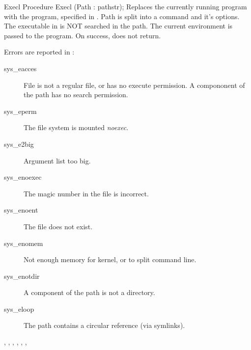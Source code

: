 \begin{procedure}{Execl}
\Declaration
Procedure Execl (Path : pathstr);
\Description
Replaces the currently running program with the program, specified in
. Path is split into a command and it's options.
The executable in  is NOT searched in the path.
The current environment is passed to the program.
On success,  does not return.

\Errors
Errors are reported in :
\begin{description}
\item[sys\_eacces] File is not a regular file, or has no execute permission.
A compononent of the path has no search permission.
\item[sys\_eperm] The file system is mounted \textit{noexec}.
\item[sys\_e2big] Argument list too big.
\item[sys\_enoexec] The magic number in the file is incorrect.
\item[sys\_enoent] The file does not exist.
\item[sys\_enomem] Not enough memory for kernel, or to split command line.
\item[sys\_enotdir] A component of the path is not a directory.
\item[sys\_eloop] The path contains a circular reference (via symlinks).
\end{description}
\SeeAlso
{}, , , ,
 , ,  
\end{procedure}


